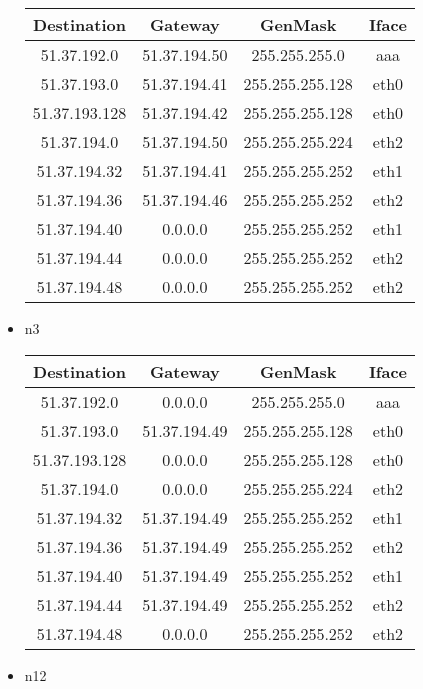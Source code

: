 \documentclass[11pt]{article} %
\begin{document}
\begin{itemize}
            \begin{tabular}{ |c|c|c|c| } 
            \hline
                Destination & Gateway & GenMask & Iface \\
            \hline
                51.37.192.0 & 51.37.194.50 & 255.255.255.0 & aaa \\
                51.37.193.0 & 51.37.194.41 & 255.255.255.128 & eth0 \\
                51.37.193.128 & 51.37.194.42 & 255.255.255.128 & eth0 \\
                51.37.194.0 & 51.37.194.50 & 255.255.255.224 & eth2 \\
                51.37.194.32 & 51.37.194.41 & 255.255.255.252 & eth1 \\
                51.37.194.36 & 51.37.194.46 & 255.255.255.252 & eth2 \\
                51.37.194.40 & 0.0.0.0 & 255.255.255.252 & eth1 \\
                51.37.194.44 & 0.0.0.0 & 255.255.255.252 & eth2 \\
                51.37.194.48 & 0.0.0.0 & 255.255.255.252 & eth2 \\
            \hline
            \end{tabular}
            \item n3
            
            \begin{tabular}{ |c|c|c|c| } 
            \hline
                Destination & Gateway & GenMask & Iface \\
            \hline
                51.37.192.0 & 0.0.0.0 & 255.255.255.0 & aaa \\
                51.37.193.0 & 51.37.194.49 & 255.255.255.128 & eth0 \\
                51.37.193.128 & 0.0.0.0 & 255.255.255.128 & eth0 \\
                51.37.194.0 & 0.0.0.0 & 255.255.255.224 & eth2 \\
                51.37.194.32 & 51.37.194.49 & 255.255.255.252 & eth1 \\
                51.37.194.36 & 51.37.194.49 & 255.255.255.252 & eth2 \\
                51.37.194.40 & 51.37.194.49 & 255.255.255.252 & eth1 \\
                51.37.194.44 & 51.37.194.49 & 255.255.255.252 & eth2 \\
                51.37.194.48 & 0.0.0.0 & 255.255.255.252 & eth2 \\
            \hline
            \end{tabular}
            \item n12


\end{itemize}
\end{document}
